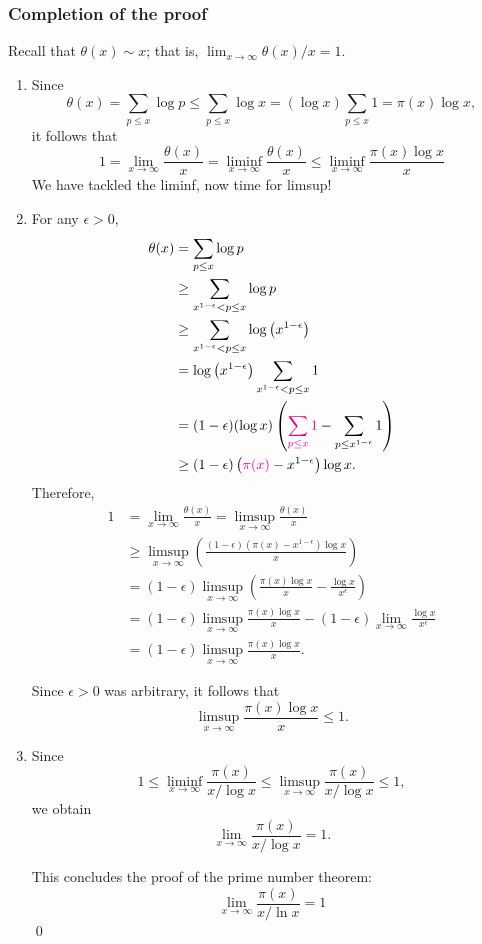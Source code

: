 \documentclass[12pt]{article}
\begin{document}
\subsubsection{Completion of the proof}
Recall that $\theta(x) \sim x$; that is, $\lim_{x\to \infty} \theta(x)/x = 1$.
\begin{enumerate}[align=left, label=\textit{Step \arabic*:}]
    \item Since \[\theta(x)=\sum_{p\leq x}\log p\leq\sum_{p\leq x}\log x=(\log x)\sum_{p\leq x}1=\pi(x)\log x,\] it follows that \[1=\operatorname*{lim}_{x\to\infty}{\frac{\theta(x)}{x}}=\liminf_{x\to\infty}{\frac{\theta(x)}{x}}\leq\liminf_{x\to\infty}{\frac{\pi(x)\log x}{x}}
    \]
    We have tackled the liminf, now time for limsup!
    \item For any $\epsilon>0$, \begin{align*}
        \theta(x) &= \sum_{p\leq x}\log p\\
        & \geq \sum_{x^{1-\epsilon}<p \leq x} \log p \\
& \geq \sum_{x^{1-\epsilon}<p \leq x} \log \left(x^{1-\epsilon}\right) \\
& =\log \left(x^{1-\epsilon}\right) \sum_{x^{1-\epsilon}<p \leq x} 1 \\
& =(1-\epsilon)(\log x)\left(\textcolor{magenta}{\sum_{p \leq x} 1}-\sum_{p \leq x^{1-\epsilon}} 1\right) \\
& \geq(1-\epsilon)\left(\textcolor{magenta}{\pi(x)}-x^{1-\epsilon}\right) \log x .
    \end{align*}
    Therefore, \[
\begin{aligned}
1 & =\lim _{x \rightarrow \infty} \frac{\theta(x)}{x}=\limsup _{x \rightarrow \infty} \frac{\theta(x)}{x} \\
& \geq \limsup _{x \rightarrow \infty}\left(\frac{(1-\epsilon)\left(\pi(x)-x^{1-\epsilon}\right) \log x}{x}\right) \\
& =(1-\epsilon) \limsup _{x \rightarrow \infty}\left(\frac{\pi(x) \log x}{x}-\frac{\log x}{x^\epsilon}\right) \\
& =(1-\epsilon) \limsup _{x \rightarrow \infty} \frac{\pi(x) \log x}{x}-(1-\epsilon) \lim _{x \rightarrow \infty} \frac{\log x}{x^\epsilon} \\
& =(1-\epsilon) \limsup _{x \rightarrow \infty} \frac{\pi(x) \log x}{x} .
\end{aligned}
\]

Since \(\epsilon>0\) was arbitrary, it follows that \[
\limsup _{x \rightarrow \infty} \frac{\pi(x) \log x}{x} \leq 1 .
\]
\item Since \[
    1 \leq \liminf _{x \rightarrow \infty} \frac{\pi(x)}{x / \log x} \leq \limsup _{x \rightarrow \infty} \frac{\pi(x)}{x / \log x} \leq 1,
    \] we obtain \[
    \lim _{x \rightarrow \infty} \frac{\pi(x)}{x / \log x}=1 .
    \]
    
    This concludes the proof of the prime number theorem: \[\lim_{x\to \infty}\frac{\pi(x)}{x/\ln x}=1\]\qed
\end{enumerate}
\end{document}
